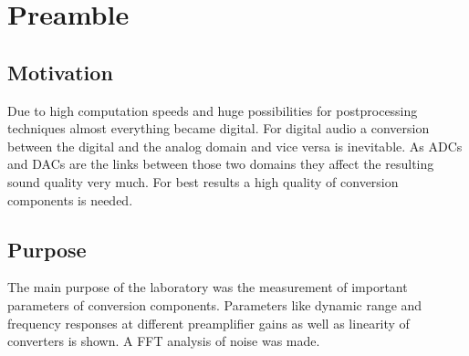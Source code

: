 \documentclass[11pt]{report}
\begin{document}


%

\newpage
\tableofcontents  

%




\listoffigures 


\pagestyle{headings}

\chapter{Preamble}
\label{kap:Einleitung} 

\section{Motivation}
Due to high computation speeds and huge possibilities for postprocessing techniques almost everything became digital. For digital audio a conversion between the digital and the analog domain and vice versa is inevitable. As ADCs and DACs are the links between those two domains they affect the resulting sound quality very much. For best results a high quality of conversion components is needed. 

\section{Purpose}
The main purpose of the laboratory was the measurement of important parameters of conversion components. Parameters like dynamic range and frequency responses at different preamplifier gains as well as linearity of converters is shown. A FFT analysis of noise was made.
\end{document}

